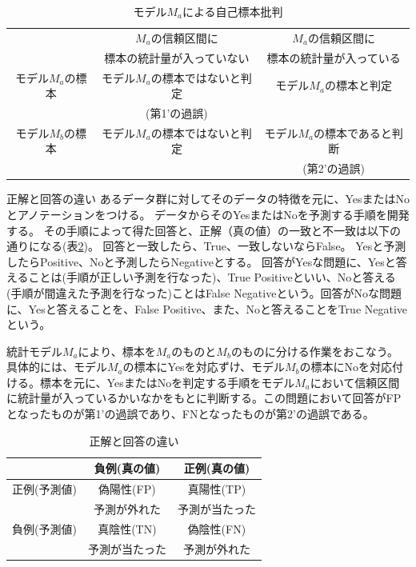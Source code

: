\begin{table}[hbtp]
 \caption{モデル$M_a$による自己標本批判}
 \label{table:type_error}
 \centering
 \begin{tabular}{ccc}
  \hline \hline
  &  $M_a$の信頼区間に &  $M_a$の信頼区間に \\
  & 標本の統計量が入っていない & 標本の統計量が入っている \\
  \hline 
  モデル$M_a$の標本  & モデル$M_a$の標本ではないと判定  & モデル$M_a$の標本と判定 \\
  & (第1'の過誤) & \\
  モデル$M_b$の標本  & モデル$M_a$の標本ではないと判定  & モデル$M_a$の標本であると判断 \\
  & & (第2'の過誤) \\
  \hline
 \end{tabular}
\end{table}


\begin{SMbox}{正解と回答の違い}
 あるデータ群に対してそのデータの特徴を元に、YesまたはNoとアノテーションをつける。
 データからそのYesまたはNoを予測する手順を開発する。
 その手順によって得た回答と、正解（真の値）の一致と不一致は以下の通りになる(表\ref{table:Yes_no_answer})。
 回答と一致したら、True、一致しないならFalse。
 Yesと予測したらPositive、Noと予測したらNegativeとする。
 回答がYesな問題に、Yesと答えることは(手順が正しい予測を行なった)、True Positiveといい、Noと答える(手順が間違えた予測を行なった)ことはFalse Negativeという。回答がNoな問題に、Yesと答えることを、False Positive、また、Noと答えることをTrue Negativeという。

統計モデル$M_a$により、標本を$M_a$のものと$M_b$のものに分ける作業をおこなう。 具体的には、モデル$M_a$の標本にYesを対応ずけ、モデル$M_b$の標本にNoを対応付ける。標本を元に、YesまたはNoを判定する手順をモデル$M_a$において信頼区間に統計量が入っているかいなかをもとに判断する。この問題において回答がFPとなったものが第1'の過誤であり、FNとなったものが第2'の過誤である。
\end{SMbox}

\begin{table}[hbtp]
 \caption{正解と回答の違い}
 \label{table:Yes_no_answer}
 \centering
 \begin{tabular}{ccc}
  \hline \hline
  &  負例(真の値) & 正例(真の値)  \\
  \hline 
  正例(予測値) &  偽陽性(FP)  & 真陽性(TP)\\
  &予測が外れた & 予測が当たった\\
  負例(予測値) & 真陰性(TN) & 偽陰性(FN)\\
  & 予測が当たった & 予測が外れた\\
  \hline
 \end{tabular}
\end{table}

